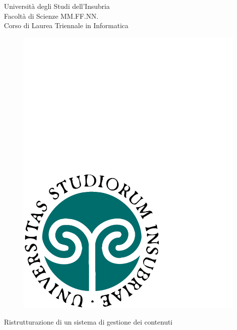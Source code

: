 \begin{titlepage}
  \begin{center}
  \begin{large}
  {\fontsize{20.74}{18}\selectfont\vspace*{0.50cm}Universit\`a degli Studi dell'Insubria}\\
  Facolt\`a di Scienze MM.FF.NN.\\
  Corso di Laurea Triennale in Informatica
  \end{large}
  
  \vspace{1cm}
  \begin{figure}[h]
    \begin{center}
      \includegraphics[scale=0.25]{copertina/logounivector.pdf}
    \end{center}
  \end{figure}

    {\fontsize{26}{26}\selectfont\par\vspace*{0.75cm}
    Ristrutturazione di un sistema
    \vspace{.15em}di gestione dei contenuti}
    \par
    

\end{center}
\end{titlepage}
